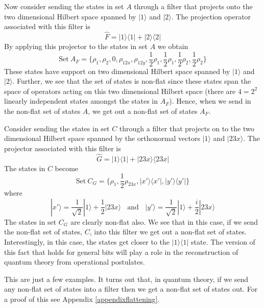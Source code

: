 \documentclass[10pt]{article}
\begin{document}
Now consider sending the states in set $A$ through a filter that projects onto the two dimensional Hilbert space spanned by $|1\rangle$ and $|2\rangle$.  The projection operator associated with this filter is
\begin{equation}
\hat F=|1\rangle\langle 1| + |2\rangle\langle 2|
\end{equation}
By applying this projector to the states in set $A$ we obtain
\begin{equation}
\text{Set}~A_F = \{ \rho_1, \rho_2, 0, \rho_{12x}, \rho_{12y}, \frac{1}{2}\rho_1, \frac{1}{2}\rho_1, \frac{1}{2}\rho_2, \frac{1}{2}\rho_2 \}
\end{equation}
These states have support on two dimensional Hilbert space spanned by $|1\rangle$ and $|2\rangle$. Further, we see that the set of states is non-flat since these states span the space of operators acting on this two dimensional Hilbert space (there are $4=2^2$ linearly independent states amongst the states in $A_F$).  Hence, when we send in the non-flat set of states $A$, we get out a non-flat set of states $A_F$.

Consider sending the states in set $C$ through a filter that projects on to the two dimensional Hilbert space spanned by the orthonormal vectors $|1\rangle$ and $|23x\rangle$.  The projector associated with this filter is
\begin{equation}
\hat G = |1\rangle\langle 1| + |23x\rangle\langle 23x|
\end{equation}
The states in $C$ become
\begin{equation}
\text{Set}~ C_G = \{ \rho_1, \frac{1}{2} \rho_{23x}, |x'\rangle\langle x'|, |y'\rangle\langle y'| \}
\end{equation}
where
\begin{equation}
|x'\rangle = \frac{1}{\sqrt{2}}|1\rangle + \frac{1}{2} |23x\rangle~~~~ \text{and} ~~~~ |y'\rangle = \frac{1}{\sqrt{2}}|1\rangle + \frac{i}{2} |23x\rangle
\end{equation}
The states in set $C_G$ are clearly non-flat also.  We see that in this case, if we send the non-flat set of states, $C$, into this filter we get out a non-flat set of states.  Interestingly, in this case, the states get closer to the $|1\rangle \langle 1|$ state.  The version of this fact that holds for general bits will play a role in the reconstruction of quantum theory from operational postulates.

This are just a few examples.  It turns out that, in quantum theory, if we send any non-flat set of states into a filter then we get a non-flat set of states out.  For a proof of this see Appendix \ref{appendixflattening}.  
\end{document}
